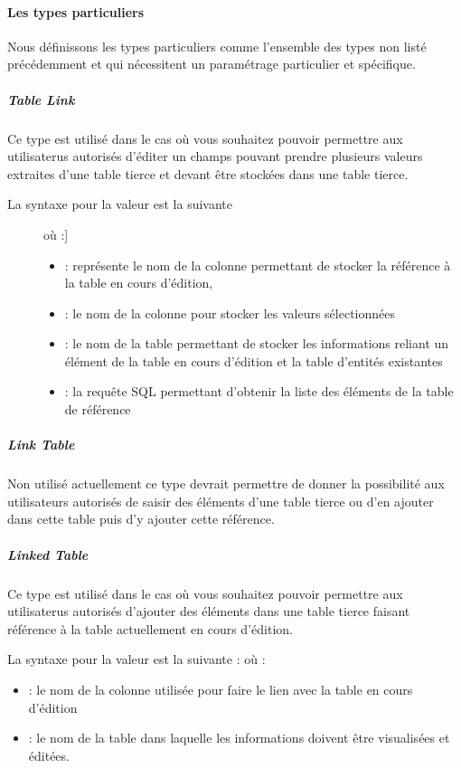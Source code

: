 \documentclass[letterpaper,10pt,english]{sphinxmanual}
\begin{document}
\paragraph{Les types particuliers}
\label{tables/infopanel:les-types-particuliers}
Nous définissons les types particuliers comme l'ensemble des types non
listé précédemment et qui nécessitent un paramétrage particulier et
spécifique.


\subparagraph{Table Link}
\label{tables/infopanel:table-link}
Ce type est utilisé dans le cas où vous souhaitez pouvoir permettre
aux utilisaterus autorisés d'éditer un champs pouvant prendre
plusieurs valeurs extraites d'une table tierce et devant être stockées
dans une table tierce.
\begin{description}
\item[{La syntaxe pour la valeur est la suivante}] \leavevmode{[} où :{]}\begin{itemize}
\item {} 
 : représente le nom de la colonne permettant de stocker la
référence à la table en cours d'édition,

\item {} 
 : le nom de la colonne pour stocker les valeurs sélectionnées

\item {} 
 : le nom de la table permettant de stocker les informations
reliant un élément de la table en cours d'édition et la table
d'entités existantes

\item {} 
 : la requête SQL permettant d'obtenir la liste des éléments
de la table de référence

\end{itemize}

\end{description}


\subparagraph{Link Table}
\label{tables/infopanel:link-table}
Non utilisé actuellement ce type devrait permettre de donner la
possibilité aux utilisateurs autorisés de saisir des éléments d'une
table tierce ou d'en ajouter dans cette table puis d'y ajouter cette
référence.


\subparagraph{Linked Table}
\label{tables/infopanel:linked-table}
Ce type est utilisé dans le cas où vous souhaitez pouvoir permettre
aux utilisaterus autorisés d'ajouter des éléments dans une table
tierce faisant référence à la table actuellement en cours d'édition.

La syntaxe pour la valeur est la suivante :  où :
\begin{itemize}
\item {} 
 : le nom de la colonne utilisée pour faire le lien avec la
table en cours d'édition

\item {} 
 : le nom de la table dans laquelle les informations doivent
être visualisées et éditées.

\end{itemize}
\end{document}
